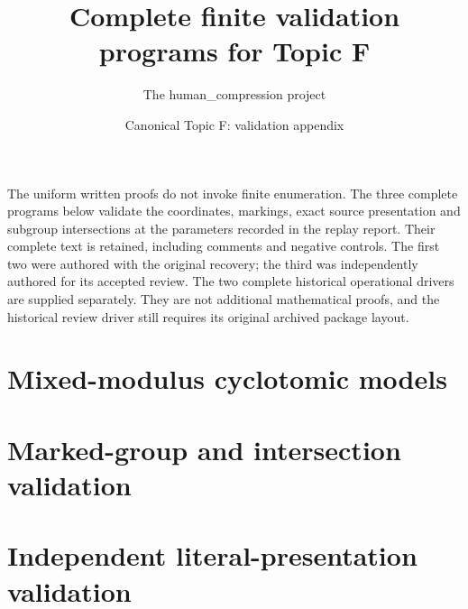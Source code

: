 
\title{Complete finite validation programs for Topic F}
\author{The human\_compression project}
\date{Canonical Topic F: validation appendix}

\maketitle
The uniform written proofs do not invoke finite enumeration. The three
complete programs below validate the coordinates, markings, exact source
presentation and subgroup intersections at the parameters recorded in the
replay report. Their complete text is retained, including comments and
negative controls. The first two were authored with the original recovery;
the third was independently authored for its accepted review. The two
complete historical operational drivers are supplied separately. They are
not additional mathematical proofs, and the historical review driver still
requires its original archived package layout.
\section{Mixed-modulus cyclotomic models}
\section{Marked-group and intersection validation}
\section{Independent literal-presentation validation}

